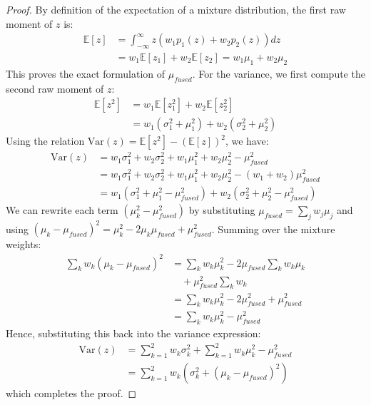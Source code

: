 \documentclass{article}
\theoremstyle{plain}
\theoremstyle{definition}
\theoremstyle{remark}
\begin{document}
\begin{proof}
By definition of the expectation of a mixture distribution, the first raw moment of $z$ is:
\begin{align}
    \mathbb{E}[z] &= \int_{-\infty}^{\infty} z \left( w_1 p_1(z) + w_2 p_2(z) \right) dz \\
    &= w_1 \mathbb{E}[z_1] + w_2 \mathbb{E}[z_2] = w_1 \mu_1 + w_2 \mu_2
\end{align}
This proves the exact formulation of $\mu_{fused}$. For the variance, we first compute the second raw moment of $z$:
\begin{align}
    \mathbb{E}[z^2] &= w_1 \mathbb{E}[z_1^2] + w_2 \mathbb{E}[z_2^2] \\
    &= w_1 (\sigma_1^2 + \mu_1^2) + w_2 (\sigma_2^2 + \mu_2^2)
\end{align}
Using the relation $\text{Var}(z) = \mathbb{E}[z^2] - (\mathbb{E}[z])^2$, we have:
\begin{align}
    \text{Var}(z) &= w_1 \sigma_1^2 + w_2 \sigma_2^2 + w_1 \mu_1^2 + w_2 \mu_2^2 - \mu_{fused}^2 \\
    &= w_1 \sigma_1^2 + w_2 \sigma_2^2 + w_1 \mu_1^2 + w_2 \mu_2^2 - (w_1 + w_2)\mu_{fused}^2 \nonumber \\
    &= w_1 (\sigma_1^2 + \mu_1^2 - \mu_{fused}^2) + w_2 (\sigma_2^2 + \mu_2^2 - \mu_{fused}^2)
\end{align}
We can rewrite each term $(\mu_k^2 - \mu_{fused}^2)$ by substituting $\mu_{fused} = \sum_j w_j \mu_j$ and using $(\mu_k - \mu_{fused})^2 = \mu_k^2 - 2 \mu_k \mu_{fused} + \mu_{fused}^2$. Summing over the mixture weights:
\begin{align}
    \sum_{k} w_k (\mu_k - \mu_{fused})^2 &= \sum_k w_k \mu_k^2 - 2 \mu_{fused} \sum_k w_k \mu_k \nonumber \\
    &\quad + \mu_{fused}^2 \sum_k w_k \\
    &= \sum_k w_k \mu_k^2 - 2 \mu_{fused}^2 + \mu_{fused}^2 \nonumber \\
    &= \sum_k w_k \mu_k^2 - \mu_{fused}^2
\end{align}
Hence, substituting this back into the variance expression:
\begin{align}
    \text{Var}(z) &= \sum_{k=1}^2 w_k \sigma_k^2 + \sum_{k=1}^2 w_k \mu_k^2 - \mu_{fused}^2 \\
    &= \sum_{k=1}^2 w_k \left( \sigma_k^2 + (\mu_k - \mu_{fused})^2 \right)
\end{align}
which completes the proof.
\end{proof}
\end{document}

